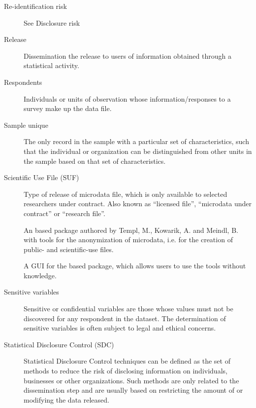\documentclass[letterpaper,10pt,english]{sphinxmanual}
\begin{document}
\begin{description}
\item[{Re-identification risk}] \leavevmode
See Disclosure risk

\item[{Release}] \leavevmode
Dissemination \textendash{} the release to users of information obtained  through a statistical activity.   \sphinxfootnotemark[2]

\item[{Respondents}] \leavevmode
Individuals or units of   observation whose  information/responses to a survey make up the data file.

\item[{Sample unique}] \leavevmode
The only record in the sample  with a particular set of  characteristics, such that
the individual or organization can be distinguished from other units in the sample based on that set of   characteristics.

\item[{Scientific Use File (SUF)}] \leavevmode
Type of release of microdata   file, which is only available to  selected researchers
under contract. Also known as “licensed file”, “microdata under contract” or “research file”.

\item[{}] \leavevmode
An  based package authored by  Templ, M., Kowarik, A. and Meindl, B. with tools for
the  anonymization of microdata, i.e.  for the creation of public- and   scientific-use files.

\item[{}] \leavevmode
A GUI for the  based    package, which allows  users to use the 
tools without  knowledge.

\item[{Sensitive variables}] \leavevmode
Sensitive or confidential variables are those whose values  must not be discovered for
any respondent in the dataset. The determination of sensitive variables is often subject to  legal and ethical concerns.

\item[{Statistical Disclosure Control (SDC)}] \leavevmode
Statistical Disclosure Control techniques can be defined as the  set of methods to reduce
the risk of disclosing information on   individuals, businesses or other  organizations.
Such methods are   only related to the dissemination step and are usually based on  restricting the amount of or   modifying the data released. \sphinxfootnotemark[2]


\end{description}
\end{document}
